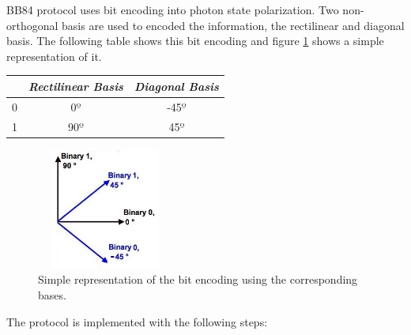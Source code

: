 BB84 protocol uses bit encoding into photon state polarization. Two non-orthogonal basis are used to encoded the information, the rectilinear and diagonal basis. The following table shows this bit encoding and figure \ref{fig:basis} shows a simple representation of it.

\begin{table}[H]
	\centering
	\begin{tabular}{c|c|c}
		 &  \textbf{\textit{Rectilinear Basis}} & \textbf{\textit{Diagonal Basis}}\\ \hline
		0 &  0$º$ & -45$º$ \\
		1 & 90$º$ & 45$º$\\
	\end{tabular}
\end{table}

\begin{figure}[H]
	\centering
	\includegraphics[width=0.4\textwidth,height=4cm]{./sdf/bb84_with_discrete_variables/figures/basis.png}
	\caption{Simple representation of the bit encoding using the corresponding bases.\cite{SURV}}\label{fig:basis}
\end{figure}


The protocol is implemented with the following steps:

